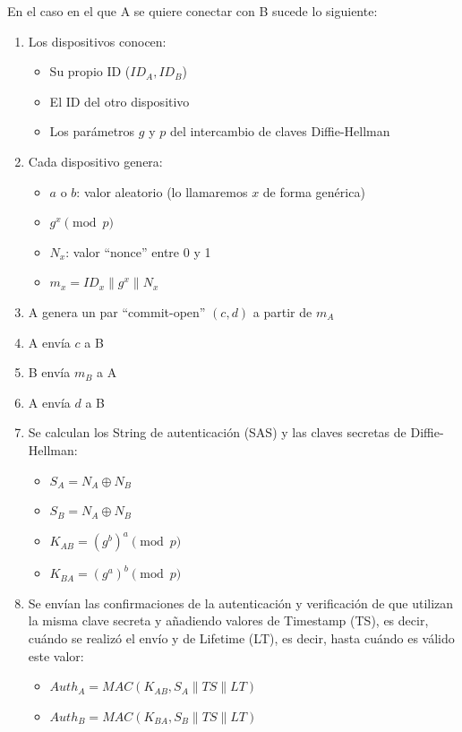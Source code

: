 \documentclass[conference,a4paper,onecolumn,11pt]{IEEEtran} %
\begin{document}
En el caso en el que A se quiere conectar con B sucede lo siguiente:

\begin{enumerate}
    \item Los dispositivos conocen:
    \begin{itemize}
        \item Su propio ID ($ID_A, ID_B$)
        \item El ID del otro dispositivo
        \item Los parámetros $g$ y $p$ del intercambio de claves Diffie-Hellman
    \end{itemize}

    \item Cada dispositivo genera:
    \begin{itemize}
        \item $a$ o $b$: valor aleatorio (lo llamaremos $x$ de forma genérica)
        \item $g^x \pmod p$
        \item $N_x$: valor ``nonce'' entre 0 y 1
        \item $m_x = ID_x \parallel g^x \parallel N_x$
    \end{itemize}

    \item A genera un par ``commit-open'' $(c, d)$ a partir de $m_A$

    \item A envía $c$ a B

    \item B envía $m_B$ a A

    \item A envía $d$ a B

    \item Se calculan los String de autenticación (SAS) y las claves secretas de Diffie-Hellman:
    \begin{itemize}
        \item $S_A = N_A \oplus N_B$
        \item $S_B = N_A \oplus N_B$
        \item $K_{AB} = (g^b)^a \pmod p$
        \item $K_{BA} = (g^a)^b \pmod p$
    \end{itemize}

    \item Se envían las confirmaciones de la autenticación y verificación de que utilizan la misma clave secreta y añadiendo valores de Timestamp (TS), es decir, cuándo se realizó el envío y de Lifetime (LT), es decir, hasta cuándo es válido este valor:
    \begin{itemize}
        \item $Auth_A = MAC(K_{AB}, S_A \parallel TS \parallel LT)$
        \item $Auth_B = MAC(K_{BA}, S_B \parallel TS \parallel LT)$
    \end{itemize}
\end{enumerate}
\end{document}

